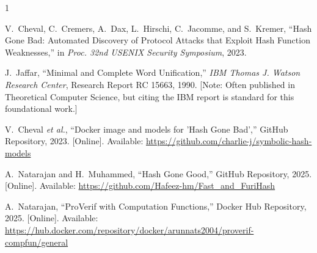 \documentclass[journal]{IEEEtran}
\begin{document}
\ifCLASSOPTIONcaptionsoff
  \newpage
\fi



\begin{thebibliography}{1}

V.~Cheval, C.~Cremers, A.~Dax, L.~Hirschi, C.~Jacomme, and S.~Kremer, ``Hash Gone Bad: Automated Discovery of Protocol Attacks that Exploit Hash Function Weaknesses,'' in \emph{Proc. 32nd USENIX Security Symposium}, 2023.

J.~Jaffar, ``Minimal and Complete Word Unification,'' \emph{IBM Thomas J. Watson Research Center}, Research Report RC 15663, 1990. [Note: Often published in Theoretical Computer Science, but citing the IBM report is standard for this foundational work.]

V.~Cheval \emph{et al.}, ``Docker image and models for 'Hash Gone Bad','' GitHub Repository, 2023. [Online]. Available: \url{https://github.com/charlie-j/symbolic-hash-models}

A.~Natarajan and H.~Muhammed, ``Hash Gone Good,'' GitHub Repository, 2025. [Online]. Available: \url{https://github.com/Hafeez-hm/Fast_and_FuriHash}

A.~Natarajan, ``ProVerif with Computation Functions,'' Docker Hub Repository, 2025. [Online]. Available: \url{https://hub.docker.com/repository/docker/arunnats2004/proverif-compfun/general}

\end{thebibliography}


\end{document}
